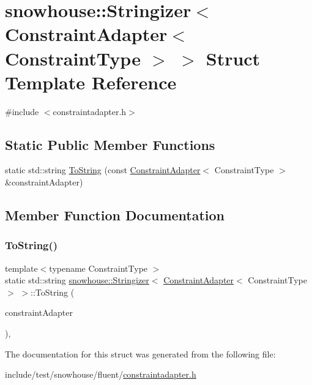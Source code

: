 \hypertarget{structsnowhouse_1_1Stringizer_3_01ConstraintAdapter_3_01ConstraintType_01_4_01_4}{}\section{snowhouse\+::Stringizer$<$ Constraint\+Adapter$<$ Constraint\+Type $>$ $>$ Struct Template Reference}
\label{structsnowhouse_1_1Stringizer_3_01ConstraintAdapter_3_01ConstraintType_01_4_01_4}


{\ttfamily \#include $<$constraintadapter.\+h$>$}

\subsection*{Static Public Member Functions}
\begin{DoxyCompactItemize}
\item 
static std\+::string \mbox{\hyperlink{structsnowhouse_1_1Stringizer_3_01ConstraintAdapter_3_01ConstraintType_01_4_01_4_af12c4a779c88f9a44c8010b8564cb5fb}{To\+String}} (const \mbox{\hyperlink{structsnowhouse_1_1ConstraintAdapter}{Constraint\+Adapter}}$<$ Constraint\+Type $>$ \&constraint\+Adapter)
\end{DoxyCompactItemize}


\subsection{Member Function Documentation}
\mbox{\label{structsnowhouse_1_1Stringizer_3_01ConstraintAdapter_3_01ConstraintType_01_4_01_4_af12c4a779c88f9a44c8010b8564cb5fb}} 
\subsubsection{\texorpdfstring{ToString()}{ToString()}}
{\footnotesize\ttfamily template$<$typename Constraint\+Type $>$ \\
static std\+::string \mbox{\hyperlink{structsnowhouse_1_1Stringizer}{snowhouse\+::\+Stringizer}}$<$ \mbox{\hyperlink{structsnowhouse_1_1ConstraintAdapter}{Constraint\+Adapter}}$<$ Constraint\+Type $>$ $>$\+::To\+String (\begin{DoxyParamCaption}\item[{const \mbox{\hyperlink{structsnowhouse_1_1ConstraintAdapter}{Constraint\+Adapter}}$<$ Constraint\+Type $>$ \&}]{constraint\+Adapter }\end{DoxyParamCaption})\hspace{0.3cm}{\ttfamily [inline]}, {\ttfamily [static]}}



The documentation for this struct was generated from the following file\+:\begin{DoxyCompactItemize}
\item 
include/test/snowhouse/fluent/\mbox{\hyperlink{constraintadapter_8h}{constraintadapter.\+h}}\end{DoxyCompactItemize}
